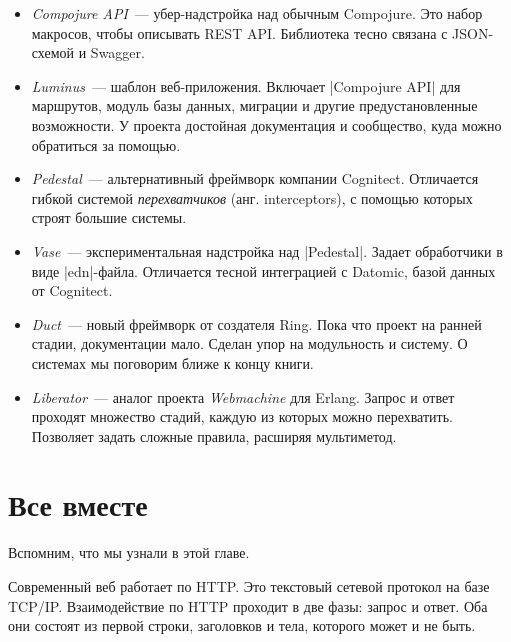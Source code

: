 \begin{itemize}

\item
  \emph{Compojure API}~---
  убер-надстройка над обычным Compojure. Это набор макросов, чтобы
  описывать REST API. Библиотека тесно связана с JSON-схемой и Swagger.

\item
  \emph{Luminus}~--- шаблон веб-приложения. Включает
  \spverb|Compojure API| для маршрутов, модуль базы данных, миграции и другие
  предустановленные возможности. У проекта достойная документация и сообщество,
  куда можно обратиться за помощью.

\item
  \emph{Pedestal}~--- альтернативный
  фреймворк компании Cognitect. Отличается гибкой системой \emph{перехватчиков}
  (анг. interceptors), с помощью которых строят большие системы.

\item
  \emph{Vase}~--- экспериментальная
  надстройка над \spverb|Pedestal|. Задает обработчики в виде
  \spverb|edn|-файла. Отличается тесной интеграцией с Datomic, базой данных от
  Cognitect.

\item
  \emph{Duct}~--- новый фреймворк от
  создателя Ring. Пока что проект на ранней стадии, документации
  мало. Сделан упор на модульность и систему. О системах мы поговорим ближе к
  концу книги.

\item
  \emph{Liberator}~--- аналог проекта
  \emph{Webmachine} для Erlang. Запрос и ответ проходят множество стадий, каждую
  из которых можно перехватить. Позволяет задать сложные правила, расширяя
  мультиметод.

\end{itemize}

\section{Все вместе}

Вспомним, что мы узнали в этой главе.

Современный веб работает по HTTP. Это текстовый сетевой протокол на базе
TCP/IP. Взаимодействие по HTTP проходит в две фазы: запрос и ответ. Оба они
состоят из первой строки, заголовков и тела, которого может и не быть.


